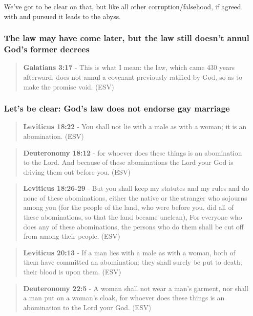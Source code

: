 \documentclass[11pt]{article}
\begin{document}
We've got to be clear on that, but like all other corruption/falsehood, if agreed with and pursued it leads to the abyss.

\subsubsection{The law may have come later, but the law still doesn't annul God's former decrees}
\label{sec:orgbab3910}
\begin{quote}
\textbf{Galatians 3:17} - This is what I mean: the law, which came 430 years afterward, does not annul a covenant previously ratified by God, so as to make the promise void. (ESV)
\end{quote}

\subsubsection{Let's be clear: God's law does not endorse gay marriage}
\label{sec:org310ab3c}
\begin{quote}
\textbf{Leviticus 18:22} - You shall not lie with a male as with a woman; it is an abomination. (ESV)
\end{quote}

\begin{quote}
\textbf{Deuteronomy 18:12} - for whoever does these things is an abomination to the Lord. And because of these abominations the Lord your God is driving them out before you. (ESV)
\end{quote}

\begin{quote}
\textbf{Leviticus 18:26-29} - But you shall keep my statutes and my rules and do none of these abominations, either the native or the stranger who sojourns among you (for the people of the land, who were before you, did all of these abominations, so that the land became unclean), For everyone who does any of these abominations, the persons who do them shall be cut off from among their people. (ESV)
\end{quote}

\begin{quote}
\textbf{Leviticus 20:13} - If a man lies with a male as with a woman, both of them have committed an abomination; they shall surely be put to death; their blood is upon them. (ESV)
\end{quote}

\begin{quote}
\textbf{Deuteronomy 22:5} - A woman shall not wear a man's garment, nor shall a man put on a woman's cloak, for whoever does these things is an abomination to the Lord your God. (ESV)
\end{quote}
\end{document}
